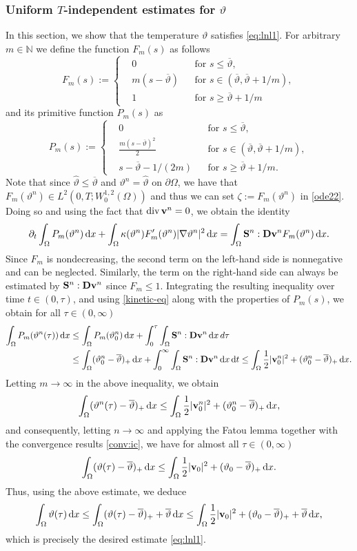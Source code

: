 \documentclass[11pt, a4paper, reqno]{amsart}
\newcommand{\N}{\mathbb N}
\numberwithin{equation}{section}
\newcommand{\diver}{\operatorname{div}}
\newcommand{\thetah}{\hat\thet}
\newcommand{\vc}[1]{{\bf #1}}
\newcommand{\vv}{\vc{v}}
\newcommand{\thet}{\vartheta}
\renewcommand{\S}{\mathbf{S}}
\newcommand{\D}{\mathbf{D}}
\newcommand{\dt}{\,{\rm d} t }
\newcommand{\dx}{\,{\rm d} {x}}
\newcommand{\intnO}[1]{\int_0^{\infty}\intO{ #1 }\dt}
\newcommand{\intO}[1]{\int_{\Omega} #1 \dx}
\newcommand{\tmax}{\overline{\thet}}
\begin{document}
\subsubsection{Uniform $T$-independent estimates for $\thet$}
In this section, we show that the temperature $\thet$ satisfies \eqref{eq:lnl1}.
For arbitrary $m\in\N$ we define the function $F_m(s)$ as follows
$$
F_m(s):=\left\{\begin{aligned}&0 &&\textrm{for }s\le \tmax,\\
&m(s-\tmax) &&\textrm{for } s\in (\tmax, \tmax + 1/m),\\
&1 &&\textrm{for }s\ge \tmax + 1/m
\end{aligned}
\right.
$$
and its primitive function $P_m(s)$ as 
$$
P_m(s):=\left\{\begin{aligned}&0 &&\textrm{for }s\le \tmax,\\
&\frac{m(s-\tmax)^2}{2} &&\textrm{for } s\in (\tmax, \tmax + 1/m),\\
&s-\tmax-1/(2m) &&\textrm{for }s\ge \tmax + 1/m.
\end{aligned}
\right.
$$
Note that since $\thetah\le \tmax$ and $\thet^n=\thetah$ on $\partial \Omega$, we have that $F_m(\thet^n)\in L^2(0,T;W_0^{1,2}(\Omega))$ and thus we can set $\zeta:= F_m(\thet^n)$ in \eqref{ode22}. Doing so and using the fact that $\diver \vv^n =0$, we obtain the identity 
$$
\partial_t \intO{P_m(\thet^n)}  +\intO{\kappa(\thet^n)F_m'(\thet^n)|\nabla\thet^{n}|^2} = \intO{\S^{n}: \D\vv^{n} F_m(\thet^n)}.
$$
Since $F_m$ is nondecreasing, the second term on the left-hand side is nonnegative and can be neglected. Similarly, the term on the right-hand side can always be estimated by $\S^n : \D\vv^n$ since $F_m \le 1$. Integrating the resulting inequality over time $t \in (0,\tau)$, and using \eqref{kinetic-eq} along with the properties of $P_m(s)$, we obtain for all $\tau \in (0,\infty)$
$$
\begin{aligned}
\intO{P_m(\thet^n(\tau))} &\le \intO{P_m(\thet_0^n)} + \int_0^\tau \intO{\S^n : \D\vv^n} \, d\tau \\
&\le \intO{(\thet_0^n - \tmax)_+} + \intnO{\S^n : \D\vv^n} \le \intO{\frac12 |\vv^n_0|^2 + (\thet_0^n - \tmax)_+}.
\end{aligned}
$$
Letting $m \to \infty$ in the above inequality, we obtain
$$
\intO{(\thet^n(\tau) - \tmax)_+} \le \intO{\frac12 |\vv^n_0|^2 + (\thet_0^n - \tmax)_+},
$$
and consequently, letting $n \to \infty$ and applying the Fatou lemma together with the convergence results \eqref{conv:ic}, we have for almost all $\tau \in (0,\infty)$
$$
\intO{(\thet(\tau) - \tmax)_+} \le \intO{\frac12 |\vv_0|^2 + (\thet_0 - \tmax)_+}.
$$
Thus, using the above estimate, we deduce
$$
\intO{\thet(\tau)} \le \intO{(\thet(\tau) - \tmax)_+ + \tmax} \le \intO{\frac12 |\vv_0|^2 + (\thet_0 - \tmax)_+ + \tmax},
$$
which is precisely the desired estimate \eqref{eq:lnl1}.
\end{document}
